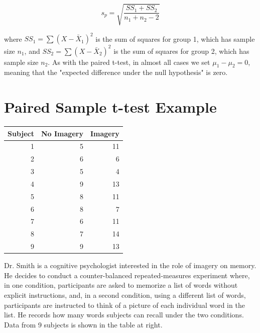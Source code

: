\documentclass{tufte-handout}
\begin{document}
\begin{equation*}
s_p=\sqrt{\frac{SS_1+SS_2}{n_1+n_2-2}}
\end{equation*}

where $SS_1=\sum{(X-\bar{X}_1)^2}$ is the sum of squares for group 1, which has sample size $n_1$, and $SS_2=\sum{(X-\bar{X}_2)^2}$  is the sum of squares for group 2, which has sample size $n_2$. As with the paired t-test, in almost all cases we set $\mu_1-\mu_2 = 0$, meaning that the "expected difference under the null hypothesis" is zero.



\section{Paired Sample t-test Example}

\begin{margintable}[80pt]
  \selectfont
  \begin{tabular}{rrr}
    \toprule
    Subject & No Imagery & Imagery\\
    \midrule
1&	5&	11\\
2&	6&	6\\
3&	5&	4\\
4&	9&	13\\
5&	8&	11\\
6&	8&	7\\
7&	6&	11\\
8&	7&	14\\
9&	9&	13\\
    \bottomrule
  \end{tabular}
  \label{tab:normaltab}
\end{margintable}


Dr. Smith is a cognitive psychologist interested in the role of imagery on memory. He decides to conduct a counter-balanced repeated-measures experiment where, in one condition, participants are asked to memorize a list of words without explicit instructions, and, in a second condition, using a different list of words, participants are instructed to think of a picture of each individual word in the list. He records how many words subjects can recall under the two conditions. Data from 9 subjects is shown in the table at right.
\end{document}
